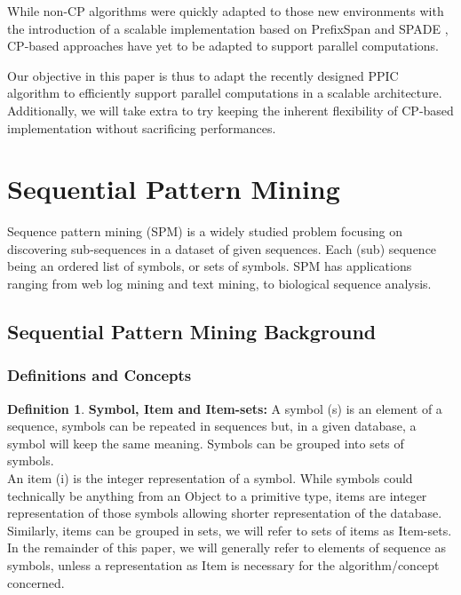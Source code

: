 \documentclass{eplmastersthesis}
\begin{document}
While non-CP algorithms were quickly adapted to those new environments with the introduction of a scalable implementation based on PrefixSpan \cite{deng2014towards} and SPADE \cite{ho2000large}, CP-based approaches have yet to be adapted to support parallel computations. \newline

Our objective in this paper is thus to adapt the recently designed PPIC algorithm to efficiently support parallel computations in a scalable architecture. Additionally, we will take extra to try keeping the inherent flexibility of CP-based implementation without sacrificing performances.

\newpage
\section{Sequential Pattern Mining}

Sequence pattern mining (SPM) is a widely studied problem focusing on discovering sub-sequences in a dataset of given sequences. Each (sub) sequence being an ordered list of symbols, or sets of symbols. SPM has applications ranging from web log mining and text mining, to biological sequence analysis.

\subsection{Sequential Pattern Mining Background}

\subsubsection{Definitions and Concepts}

\theoremstyle{definition}
\newtheorem{definition}{Definition}[]

\theoremstyle{example}
\newtheorem{example}{Example}[]

\begin{definition}{\bfseries Symbol, Item and Item-sets:}
A symbol (s) is an element of a sequence, symbols can be repeated in sequences but, in a given database, a symbol will keep the same meaning. Symbols can be grouped into sets of symbols. \\
An item (i) is the integer representation of a symbol. While symbols could technically be anything from an Object to a primitive type, items are integer representation of those symbols allowing shorter representation of the database. Similarly, items can be grouped in sets, we will refer to sets of items as Item-sets. \\
In the remainder of this paper, we will generally refer to elements of sequence as symbols, unless a representation as Item is necessary for the algorithm/concept concerned.
\end{definition}
\end{document}
